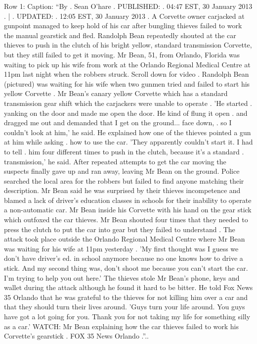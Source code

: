 \begin{table}[H]
\centering
\caption{Row 1\ifshowcaption{}: Caption: ``By . Sean O'hare . PUBLISHED: . 04:47 EST, 30 January 2013 . | . UPDATED: . 12:05 EST, 30 January 2013 . A Corvette owner carjacked at gunpoint managed to keep hold of his car after bungling thieves failed to work the manual gearstick and fled. Randolph Bean repeatedly shouted at the car thieves to push in the clutch of his bright yellow, standard transmission Corvette, but they still failed to get it moving. Mr Bean, 51, from Orlando, Florida was waiting to pick up his wife from work at the Orlando Regional Medical Centre at 11pm last night when the robbers struck. Scroll down for video . Randolph Bean (pictured) was waiting for his wife when two gunmen tried and failed to start his yellow Corvette . Mr Bean's canary yellow Corvette which has a standard transmission gear shift which the carjackers were unable to operate . 'He started . yanking on the door and made me open the door. He kind of flung it open . and dragged me out and demanded that I get on the ground... face down, . so I couldn't look at him,' he said. He explained how one of the thieves pointed a gun at him while asking . how to use the car. 'They apparently couldn't start it. I had to tell . him four different times to push in the clutch, because it's a standard . transmission,' he said. After repeated attempts to get the car moving the suspects finally gave up and ran away, leaving Mr Bean on the ground. Police searched the local area for the robbers but failed to find anyone matching their description. Mr Bean said he was surprised by their thieves incompetence and blamed a lack of driver's education classes in schools for their inability to operate a non-automatic car. Mr Bean inside his Corvette with his hand on the gear stick which outfoxed the car thieves. Mr Bean shouted four times that they needed to press the clutch to put the car into gear but they failed to understand . The attack took place outside the Orlando Regional Medical Centre where Mr Bean was waiting for his wife at 11pm yesterday . 'My first thought was I guess we don't have driver's ed. in school anymore because no one knows how to drive a stick. And my second thing was, don't shoot me because you can't start the car. I'm trying to help you out here.' The thieves stole Mr Bean's phone, keys and wallet during the attack although he found it hard to be bitter. He told Fox News 35 Orlando that he was grateful to the thieves for not killing him over a car and that they should turn their lives around. 'Guys turn your life around. You guys have got a lot going for you. Thank you for not taking my life for something silly as a car.' WATCH: Mr Bean explaining how the car thieves failed to work his Corvette's gearstick . FOX 35 News Orlando .''.\else.}

\end{table}
